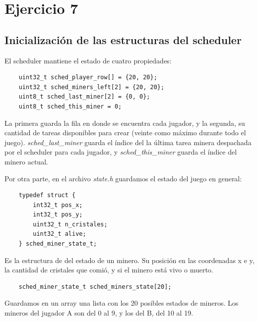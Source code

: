\documentclass[a4paper]{article}
\newenvironment{codesnippet}{%
	\begin{Sbox}\begin{minipage}{\textwidth}\sffamily\small}%
	{\end{minipage}\end{Sbox}%
		\begin{center}%
		\vspace{-0.4cm}\colorbox{litegrey}{\TheSbox}\end{center}\vspace{0.3cm}}
\begin{document}
\section{Ejercicio 7}

\subsection{Inicialización de las estructuras del scheduler}

El scheduler mantiene el estado de cuatro propiedades:

\begin{codesnippet}
  \begin{verbatim}
	uint32_t sched_player_row[] = {20, 20};
	uint32_t sched_miners_left[2] = {20, 20};
	uint8_t sched_last_miner[2] = {0, 0};
	uint8_t sched_this_miner = 0;
  \end{verbatim}
\end{codesnippet}

La primera guarda la fila en donde se encuentra cada jugador, y la segunda, su cantidad de tareas disponibles para crear
(veinte como máximo durante todo el juego). \textit{sched_last_miner} guarda el índice del la última tarea minera
despachada por el scheduler para cada jugador, y \textit{sched_this_miner} guarda el índice del minero actual.

Por otra parte, en el archivo \textit{state.h} guardamos el estado del juego en general:

\begin{codesnippet}
  \begin{verbatim}
	typedef struct {
    	int32_t pos_x;
	    int32_t pos_y;
	    uint32_t n_cristales;
	    uint32_t alive;
	} sched_miner_state_t;
  \end{verbatim}
\end{codesnippet}

Es la estructura de del estado de un minero. Su posición en las coordenadas x e y, la cantidad de cristales que comió, y
si el minero está vivo o muerto.

\begin{codesnippet}
  \begin{verbatim}
	sched_miner_state_t sched_miners_state[20];
  \end{verbatim}
\end{codesnippet}

Guardamos en un array una lista con los 20 posibles estados de mineros. Los mineros del jugador A son del 0 al 9, y los
del B, del 10 al 19.
\end{document}
